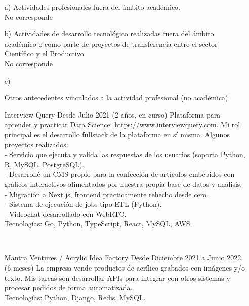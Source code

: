 \begin{enumerate}[leftmargin=0.8cm]
    \item[a)]{Actividades profesionales fuera del ámbito académico.
        \\No corresponde
    }

    \item[b)]{Actividades de desarrollo tecnológico realizadas fuera del ámbito académico o como parte de proyectos de transferencia entre el sector Científico y el Productivo
        \\No corresponde
    }

    \item[c)]{Otros antecedentes vinculados a la actividad profesional (no académica).

    \begin{itemize}[leftmargin=0.2cm]

      {Interview Query}
      {Desde Julio 2021 (2 años, en curso)}
      {
        Plataforma para aprender y practicar Data Science: \url{https://www.interviewquery.com}. Mi rol principal es el desarrollo fullstack de la plataforma en sí misma. Algunos proyectos realizados:
        \\ - Servicio que ejecuta y valida las respuestas de los usuarios (soporta Python, R, MySQL, PostgreSQL).
        \\ - Desarrollé un CMS propio para la confección de artículos embebidos con gráficos interactivos alimentados por nuestra propia base de datos y análisis.
        \\ - Migración a Next.js, frontend prácticamente rehecho desde cero.
        \\ - Sistema de ejecución de jobs tipo ETL (Python).
        \\ - Videochat desarrollado con WebRTC.
        \\ Tecnologías: Go, Python, TypeScript, React, MySQL, AWS.
      }

      ~

      {Mantra Ventures / Acrylic Idea Factory}
      {Desde Diciembre 2021 a Junio 2022 (6 meses)}
      {
        La empresa vende productos de acrílico grabados con imágenes y/o texto. Mis tareas son desarrollar APIs para integrar con otros sistemas y procesar pedidos de forma automatizada.
        \\ Tecnologías: Python, Django, Redis, MySQL.
      }

      ~


\end{itemize}}
\end{enumerate}
